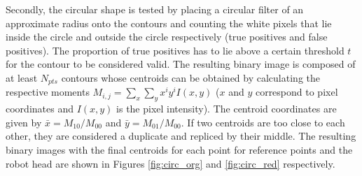 Secondly, the circular shape is tested by placing a circular filter of an approximate radius onto the contours and counting the white pixels that lie inside the circle and outside the circle respectively (true positives and false positives). 
The proportion of true positives has to lie above a certain threshold $t$ for the contour to be considered valid.  
The resulting binary image is composed of at least $N_{pts}$ contours whose centroids can be obtained by calculating the respective moments $M_{i,j}=\sum_{x} \sum_{y} x^iy^i I(x,y)$ ($x$ and $y$ correspond to pixel coordinates and $I(x,y)$ is the pixel intensity). 
The centroid coordinates are given by $\bar{x}=M_{10}/M_{00}$ and $\bar{y}=M_{01}/M_{00}$. If two centroids are too close to each other, they are considered a duplicate and repliced by their middle.
The resulting binary images with the final centroids for each point for reference points and the robot head are shown in Figures \ref{fig:circ_org} and \ref{fig:circ_red} respectively.

